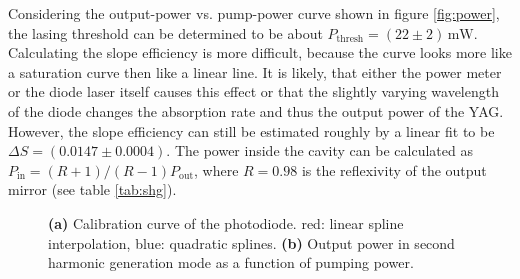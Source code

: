 \documentclass[a4paper]{scrartcl}
\numberwithin{equation}{section}
\numberwithin{figure}{section}
\numberwithin{table}{section}
\begin{document}
Considering the output-power vs. pump-power curve shown in figure \ref{fig:power}, the lasing threshold can be determined to be about $P_\text{thresh}=(22\pm 2)\,\text{mW}$. Calculating the slope efficiency is more difficult, because the curve looks more like a saturation curve then like a linear line. It is likely, that either the power meter or the diode laser itself causes this effect or that the slightly varying wavelength of the diode changes the absorption rate and thus the output power of the YAG. However, the slope efficiency can still be estimated roughly by a linear fit to be $\Delta S = (0.0147\pm 0.0004)$. The power inside the cavity can be calculated as $P_\text{in}=(R+1)/(R-1) P_\text{out}$, where $R=0.98$ is the reflexivity of the output mirror (see table \ref{tab:shg}).

\FloatBarrier
\begin{figure}[!ht]
\centering
{}
\hfill
{}
\caption{\footnotesize \textbf{(a)} Calibration curve of the photodiode. red: linear spline interpolation, blue: quadratic splines. \textbf{(b)} Output power in second harmonic generation mode as a function of pumping power.}
\label{fig:diode}
\end{figure}
\end{document}
